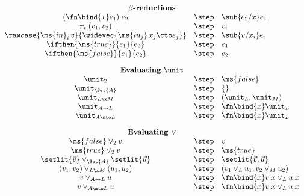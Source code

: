 \begin{figure*}
\begin{minipage}{0.45\textwidth}
  \end{minipage}
  \vspace{1em}
  \begin{displaymath}
    \begin{array}{ccl}
      \multicolumn{3}{c}{\textbf{$\beta$-reductions}}\\
      (\fn\bind{x}e_1) \; e_2 &\step& \sub{e_2/x} e_1\\
      \pi_i \; (v_1, v_2) &\step& v_i\\
      \rawcase{\ms{in}_i\,v}{\widevec{\ms{in_j}\,x_j \cto e_j}}
      &\step& \sub{v/x_i} e_i\\
      \ifthen{\ms{true}}{e_1}{e_2} &\step& e_1\\
      \ifthen{\ms{false}}{e_1}{e_2} &\step& e_2

      \vspace{1em}\\
      \multicolumn{3}{c}{\textbf{Evaluating }\unit}\\
      \unit_2 &\step& \ms{false}\\
      \unit_{\Set{A}} &\step& \{\}\\
      \unit_{L \x M} &\step& (\unit_L, \unit_M)\\
      \unit_{A \to L} &\step& \fn\bind{x} \unit_L\\
      \unit_{A \mto L} &\step& \fn\bind{x} \unit_L

      \vspace{1em}\\
      \multicolumn{3}{c}{\textbf{Evaluating }\vee}\\
      \ms{false} \vee_2 v &\step& v\\
      \ms{true} \vee_2 v &\step& \ms{true}\\
      \setlit{\vec{v}} \vee_{\Set{A}} \setlit{\vec{u}} &\step& \setlit{\vec{v}, \vec{u}}\\
      (v_1, v_2) \vee_{L \x M} (u_1, u_2) &\step& (v_1 \vee_L u_1, v_2 \vee_M u_2)\\
      v \vee_{A \to L} u &\step& \fn\bind{x} v\;x \vee_L u\;x\\
      v \vee_{A \mto L} u &\step& \fn\bind{x} v\;x \vee_L u\;x


\end{array}
\end{displaymath}
\end{figure*}
